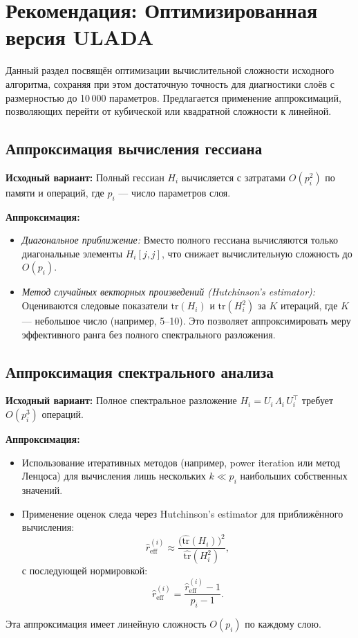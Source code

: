 \documentclass[a4paper,12pt]{article}
\begin{document}
\bigskip

\section{Рекомендация: Оптимизированная версия ULADA}

Данный раздел посвящён оптимизации вычислительной сложности исходного алгоритма, сохраняя при этом достаточную точность для диагностики слоёв с размерностью до 10\,000 параметров. Предлагается применение аппроксимаций, позволяющих перейти от кубической или квадратной сложности к линейной.

\subsection*{Аппроксимация вычисления гессиана}

\textbf{Исходный вариант:} Полный гессиан \( H_i \) вычисляется с затратами \( O(p_i^2) \) по памяти и операций, где \( p_i \) --- число параметров слоя.

\textbf{Аппроксимация:}
\begin{itemize}
    \item \emph{Диагональное приближение:} Вместо полного гессиана вычисляются только диагональные элементы \( H_i[j,j] \), что снижает вычислительную сложность до \( O(p_i) \).
    \item \emph{Метод случайных векторных произведений (Hutchinson’s estimator):} Оцениваются следовые показатели \(\text{tr}(H_i)\) и \(\text{tr}(H_i^2)\) за \( K \) итераций, где \( K \) --- небольшое число (например, 5--10). Это позволяет аппроксимировать меру эффективного ранга без полного спектрального разложения.
\end{itemize}

\subsection*{Аппроксимация спектрального анализа}

\textbf{Исходный вариант:} Полное спектральное разложение \( H_i = U_i\,\Lambda_i\,U_i^\top \) требует \( O(p_i^3) \) операций.

\textbf{Аппроксимация:}
\begin{itemize}
    \item Использование итеративных методов (например, power iteration или метод Ленцоса) для вычисления лишь нескольких \( k \ll p_i \) наибольших собственных значений.
    \item Применение оценок следа через Hutchinson’s estimator для приближённого вычисления:
    \begin{equation}
    \widehat{r}_{\text{eff}}^{(i)} \approx \frac{\Big(\widehat{\text{tr}}(H_i)\Big)^2}{\widehat{\text{tr}}(H_i^2)},
    \end{equation}
    с последующей нормировкой:
    \begin{equation}
    \hat{r}_{\text{eff}}^{(i)} = \frac{\widehat{r}_{\text{eff}}^{(i)} - 1}{p_i - 1}.
    \end{equation}
\end{itemize}
Эта аппроксимация имеет линейную сложность \( O(p_i) \) по каждому слою.
\end{document}
